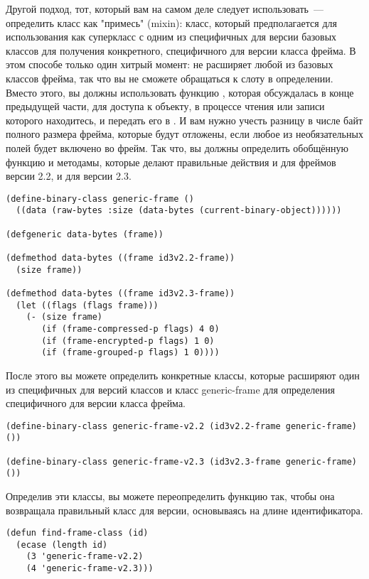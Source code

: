 Другой подход, тот, который вам на самом деле следует использовать~--- определить класс
 как "примесь" (mixin): класс, который предполагается для
использования как суперкласс с одним из специфичных для версии базовых классов для
получения конкретного, специфичного для версии класса фрейма. В этом способе только один
хитрый момент:  не расширяет любой из базовых классов фрейма, так что
вы не сможете обращаться к слоту  в определении. Вместо этого, вы должны
использовать функцию , которая обсуждалась в конце предыдущей
части, для доступа к объекту, в процессе чтения или записи которого находитесь, и передать
его в . И вам нужно учесть разницу в числе байт полного размера фрейма, которые
будут отложены, если любое из необязательных полей будет включено во фрейм. Так что, вы
должны определить обобщённую функцию  и методамы, которые делают
правильные действия и для фреймов версии 2.2, и для версии 2.3.

\begin{lstlisting}
(define-binary-class generic-frame ()
  ((data (raw-bytes :size (data-bytes (current-binary-object))))))

(defgeneric data-bytes (frame))

(defmethod data-bytes ((frame id3v2.2-frame))
  (size frame))

(defmethod data-bytes ((frame id3v2.3-frame))
  (let ((flags (flags frame)))
    (- (size frame)
       (if (frame-compressed-p flags) 4 0)
       (if (frame-encrypted-p flags) 1 0)
       (if (frame-grouped-p flags) 1 0))))
\end{lstlisting}

После этого вы можете определить конкретные классы, которые расширяют один из специфичных
для версий классов и класс generic-frame для определения специфичного для версии класса
фрейма.

\begin{lstlisting}
(define-binary-class generic-frame-v2.2 (id3v2.2-frame generic-frame) ())

(define-binary-class generic-frame-v2.3 (id3v2.3-frame generic-frame) ())
\end{lstlisting}

Определив эти классы, вы можете переопределить функцию  так, чтобы
она возвращала правильный класс для версии, основываясь на длине идентификатора.

\begin{lstlisting}
(defun find-frame-class (id)
  (ecase (length id)
    (3 'generic-frame-v2.2)
    (4 'generic-frame-v2.3)))
\end{lstlisting}


